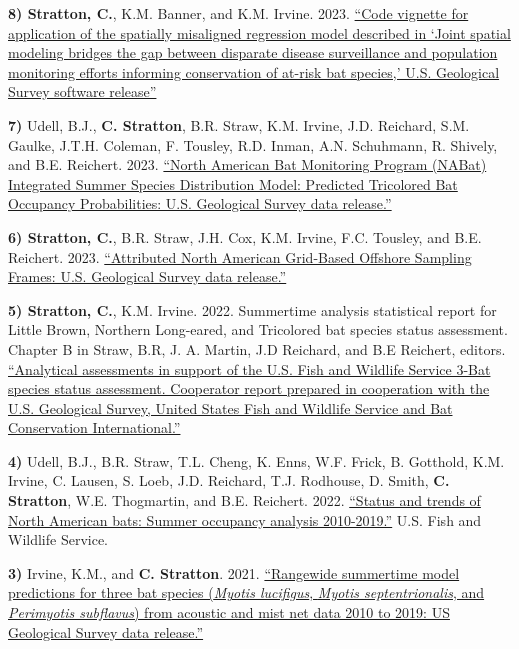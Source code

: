 \documentclass[a4paper]{article}
\begin{document}
\textbf{8) Stratton, C.}, K.M. Banner, and K.M. Irvine. 2023.
\href{https://code.usgs.gov/usgs/norock/irvine_k/spatial-misalignment-application}{``Code
vignette for application of the spatially misaligned regression model
described in `Joint spatial modeling bridges the gap between disparate
disease surveillance and population monitoring efforts informing
conservation of at-risk bat species,' U.S. Geological Survey software
release''} \vspace*{2mm}

\textbf{7)} Udell, B.J., \textbf{C. Stratton}, B.R. Straw, K.M. Irvine,
J.D. Reichard, S.M. Gaulke, J.T.H. Coleman, F. Tousley, R.D. Inman, A.N.
Schuhmann, R. Shively, and B.E. Reichert. 2023.
\href{https://doi.org/10.5066/P9MV37I7}{``North American Bat Monitoring
Program (NABat) Integrated Summer Species Distribution Model: Predicted
Tricolored Bat Occupancy Probabilities: U.S. Geological Survey data
release.''} \vspace*{2mm}

\textbf{6) Stratton, C.}, B.R. Straw, J.H. Cox, K.M. Irvine, F.C.
Tousley, and B.E. Reichert. 2023.
\href{https://doi.org/10.5066/P9H8NEOY}{``Attributed North American
Grid-Based Offshore Sampling Frames: U.S. Geological Survey data
release.''} \vspace*{2mm}

\textbf{5) Stratton, C.}, K.M. Irvine. 2022. Summertime analysis
statistical report for Little Brown, Northern Long-eared, and Tricolored
bat species status assessment. Chapter B in Straw, B.R, J. A. Martin,
J.D Reichard, and B.E Reichert, editors.
\href{https://doi.org/10.7944/P9B4RWEU}{``Analytical assessments in
support of the U.S. Fish and Wildlife Service 3-Bat species status
assessment. Cooperator report prepared in cooperation with the U.S.
Geological Survey, United States Fish and Wildlife Service and Bat
Conservation International.''} \vspace*{2mm}

\textbf{4)} Udell, B.J., B.R. Straw, T.L. Cheng, K. Enns, W.F. Frick, B.
Gotthold, K.M. Irvine, C. Lausen, S. Loeb, J.D. Reichard, T.J. Rodhouse,
D. Smith, \textbf{C. Stratton}, W.E. Thogmartin, and B.E. Reichert.
2022. \href{https://doi.org/10.5066/P92JGACB}{``Status and trends of
North American bats: Summer occupancy analysis 2010-2019.''} U.S. Fish
and Wildlife Service. \vspace*{2mm}

\textbf{3)} Irvine, K.M., and \textbf{C. Stratton}. 2021.
\href{https://doi.org/10.5066/P9XZ8D6N.}{``Rangewide summertime model
predictions for three bat species (\textit{Myotis lucifigus},
\textit{Myotis septentrionalis}, and \textit{Perimyotis subflavus}) from
acoustic and mist net data 2010 to 2019: US Geological Survey data
release.''} \vspace*{2mm}
\end{document}
